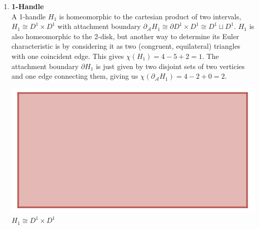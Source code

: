 \documentclass[12pt]{article}
\newcommand{\cA}{{\mathcal A}}
\theoremstyle{definition}
\begin{document}
\begin{enumerate}
\begin{center}
            \end{center}
      \item \textbf{1-Handle}\\
            A 1-handle $H_1$ is homeomorphic to the cartesian product of two intervals, $H_1 \cong D^1\times D^1$ with attachment boundary $\partial_\cA H_1 \cong \partial D^1 \times D^1 \cong D^1 \sqcup D^1$. $H_1$ is also homeomorphic to the 2-disk, but another way to determine its Euler characteristic is by considering it as two (congruent, equilateral) triangles with one coincident edge. This gives $\chi(H_1) = 4 - 5+ 2 = 1$. The attachment boundary $\partial H_1$ is just given by two disjoint sets of two verticies and one edge connecting them, giving us $\chi(\partial_\cA H_1) = 4 - 2 + 0 = 2$. 
            \begin{center}
                  \includegraphics[scale=0.5]{H_1.png} \\
                  $H_1 \cong D^1\times D^1$


\end{center}
\end{enumerate}
\end{document}
